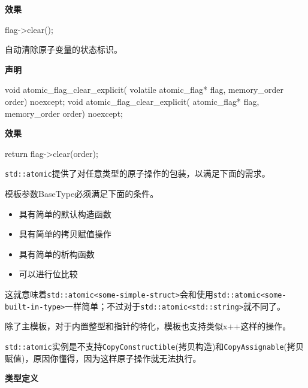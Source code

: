 \textbf{效果}

\begin{cpp}
flag->clear();
\end{cpp}


自动清除原子变量的状态标识。

\textbf{声明}

\begin{cpp}
void atomic_flag_clear_explicit(
    volatile atomic_flag* flag, memory_order order) noexcept;
void atomic_flag_clear_explicit(
    atomic_flag* flag, memory_order order) noexcept;
\end{cpp}

\textbf{效果}

\begin{cpp}
return flag->clear(order);
\end{cpp}


\texttt{std::atomic}提供了对任意类型的原子操作的包装，以满足下面的需求。

模板参数BaseType必须满足下面的条件。

\begin{itemize}
    \item 具有简单的默认构造函数
    \item 具有简单的拷贝赋值操作
    \item 具有简单的析构函数
    \item 可以进行位比较
\end{itemize}

这就意味着\texttt{std::atomic<some-simple-struct>}会和使用\texttt{std::atomic<some-built-in-type>}一样简单；不过对于\texttt{std::atomic<std::string>}就不同了。

除了主模板，对于内置整型和指针的特化，模板也支持类似x++这样的操作。

\texttt{std::atomic}实例是不支持\texttt{CopyConstructible}(拷贝构造)和\texttt{CopyAssignable}(拷贝赋值)，原因你懂得，因为这样原子操作就无法执行。

\textbf{类型定义}

